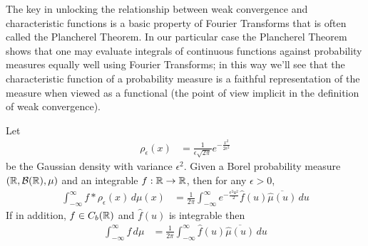 The key in unlocking the relationship between weak convergence and
characteristic functions is a basic property of Fourier Transforms
that is often called the Plancherel Theorem.  In our particular case
the Plancherel Theorem shows that one may evaluate integrals of
continuous functions against probability measures equally well using
Fourier Transforms; in this way we'll see that the characteristic
function of a probability measure is a faithful representation of the
measure when viewed as a functional (the point of view implicit in
the definition of weak convergence).
\begin{thm}\label{PlancherelTheorem}Let 
\begin{align*}
\rho_\epsilon(x) &= \frac{1}{\epsilon\sqrt{2 \pi}}
  e^{-\frac{x^2}{2\epsilon^2}}
\end{align*}  be the Gaussian density with variance $\epsilon^2$.  Given a Borel probability measure
  $(\mathbb{R}, \mathcal{B}(\mathbb{R}), \mu)$ and an integrable $f : \mathbb{R}
  \to \mathbb{R}$, then for any $\epsilon > 0$,
\begin{align*}
\int_{-\infty}^\infty f * \rho_\epsilon (x) \, d\mu(x) &=
\frac{1}{2\pi} \int_{-\infty}^\infty e^{-\frac{\epsilon^2 u^2}{2}} \hat{f}(u) \overline{\hat{\mu}(u)}\, du
\end{align*}
If in addition, $f \in C_b(\mathbb{R})$ and $\hat{f}(u)$ is integrable
then
\begin{align*}
\int_{-\infty}^\infty f \, d\mu &= \frac{1}{2 \pi}
\int_{-\infty}^\infty \hat{f}(u) \overline{\hat{\mu}(u)}\, du
\end{align*}
\end{thm}
